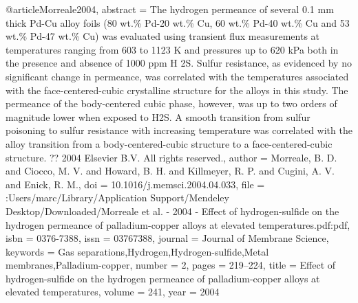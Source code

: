 @article{Morreale2004,
abstract = {The hydrogen permeance of several 0.1 mm thick Pd-Cu alloy foils (80 wt.{\%} Pd-20 wt.{\%} Cu, 60 wt.{\%} Pd-40 wt.{\%} Cu and 53 wt.{\%} Pd-47 wt.{\%} Cu) was evaluated using transient flux measurements at temperatures ranging from 603 to 1123 K and pressures up to 620 kPa both in the presence and absence of 1000 ppm H 2S. Sulfur resistance, as evidenced by no significant change in permeance, was correlated with the temperatures associated with the face-centered-cubic crystalline structure for the alloys in this study. The permeance of the body-centered cubic phase, however, was up to two orders of magnitude lower when exposed to H2S. A smooth transition from sulfur poisoning to sulfur resistance with increasing temperature was correlated with the alloy transition from a body-centered-cubic structure to a face-centered-cubic structure. ?? 2004 Elsevier B.V. All rights reserved.},
author = {Morreale, B. D. and Ciocco, M. V. and Howard, B. H. and Killmeyer, R. P. and Cugini, A. V. and Enick, R. M.},
doi = {10.1016/j.memsci.2004.04.033},
file = {:Users/marc/Library/Application Support/Mendeley Desktop/Downloaded/Morreale et al. - 2004 - Effect of hydrogen-sulfide on the hydrogen permeance of palladium-copper alloys at elevated temperatures.pdf:pdf},
isbn = {0376-7388},
issn = {03767388},
journal = {Journal of Membrane Science},
keywords = {Gas separations,Hydrogen,Hydrogen-sulfide,Metal membranes,Palladium-copper},
number = {2},
pages = {219--224},
title = {{Effect of hydrogen-sulfide on the hydrogen permeance of palladium-copper alloys at elevated temperatures}},
volume = {241},
year = {2004}
}
